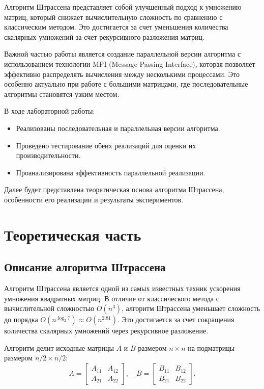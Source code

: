 \documentclass[a4paper, 14pt]{extarticle}
\begin{document}
Алгоритм Штрассена представляет собой улучшенный подход к умножению матриц, который снижает вычислительную сложность по сравнению с классическим методом. Это достигается за счет уменьшения количества скалярных умножений за счет рекурсивного разложения матриц. 

Важной частью работы является создание параллельной версии алгоритма с использованием технологии MPI (Message Passing Interface), которая позволяет эффективно распределять вычисления между несколькими процессами. Это особенно актуально при работе с большими матрицами, где последовательные алгоритмы становятся узким местом.

В ходе лабораторной работы:
\begin{itemize}
    \item Реализованы последовательная и параллельная версии алгоритма.
    \item Проведено тестирование обеих реализаций для оценки их производительности.
    \item Проанализирована эффективность параллельной реализации.
\end{itemize}

Далее будет представлена теоретическая основа алгоритма Штрассена, особенности его реализации и результаты экспериментов.

    \newpage
    \section{Теоретическая часть}
\subsection{Описание алгоритма Штрассена}

Алгоритм Штрассена является одной из самых известных техник ускорения умножения квадратных матриц. В отличие от классического метода с вычислительной сложностью \(O(n^3)\), алгоритм Штрассена уменьшает сложность до порядка \(O(n^{\log_2 7}) \approx O(n^{2.81})\). Это достигается за счет сокращения количества скалярных умножений через рекурсивное разложение.

Алгоритм делит исходные матрицы \(A\) и \(B\) размером \(n \times n\) на подматрицы размером \(n/2 \times n/2\):
\[
A = \begin{bmatrix}
A_{11} & A_{12} \\
A_{21} & A_{22}
\end{bmatrix}, \quad
B = \begin{bmatrix}
B_{11} & B_{12} \\
B_{21} & B_{22}
\end{bmatrix}.
\]
\end{document}
